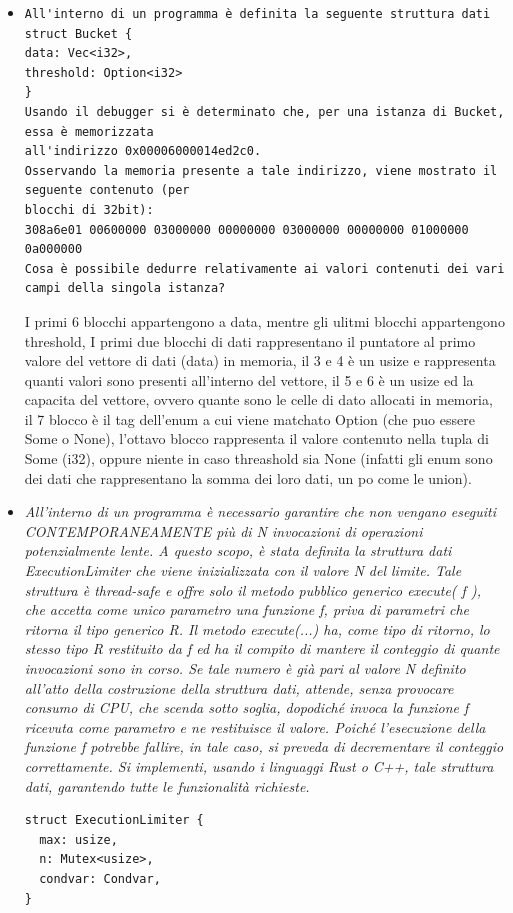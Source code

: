 \documentclass[12pt]{article}
\begin{document}
\begin{itemize}
  \item
  \begin{lstlisting}[langua=rust]
All'interno di un programma è definita la seguente struttura dati
struct Bucket {
data: Vec<i32>,
threshold: Option<i32>
}
Usando il debugger si è determinato che, per una istanza di Bucket, essa è memorizzata
all'indirizzo 0x00006000014ed2c0.
Osservando la memoria presente a tale indirizzo, viene mostrato il seguente contenuto (per
blocchi di 32bit):
308a6e01 00600000 03000000 00000000 03000000 00000000 01000000 0a000000
Cosa è possibile dedurre relativamente ai valori contenuti dei vari campi della singola istanza?
  \end{lstlisting}
  I primi 6 blocchi appartengono a data, mentre gli ulitmi blocchi appartengono threshold,
  I primi due blocchi di dati rappresentano il puntatore al primo valore del vettore di dati (data) in memoria, il 3 e 4 \`e un usize e rappresenta quanti valori sono presenti all'interno del vettore, il 5 e 6 \`e un usize ed la capacita del vettore, ovvero quante sono le celle di dato allocati in memoria, il 7 blocco \`e il tag dell'enum a cui viene matchato Option (che puo essere Some o None), l'ottavo blocco rappresenta il valore contenuto nella tupla di Some (i32), oppure niente in caso threashold sia None (infatti gli enum sono dei dati che rappresentano la somma dei loro dati, un po come le union).
  \item \emph{All'interno di un programma è necessario garantire che non vengano eseguiti
CONTEMPORANEAMENTE più di N invocazioni di operazioni potenzialmente lente.
A questo scopo, è stata definita la struttura dati ExecutionLimiter che viene inizializzata con il
valore N del limite. Tale struttura è thread-safe e offre solo il metodo pubblico generico execute( f
), che accetta come unico parametro una funzione f, priva di parametri che ritorna il tipo generico
R. Il metodo execute(...) ha, come tipo di ritorno, lo stesso tipo R restituito da f ed ha il compito di
mantere il conteggio di quante invocazioni sono in corso. Se tale numero è già pari al valore N
definito all'atto della costruzione della struttura dati, attende, senza provocare consumo di CPU,
che scenda sotto soglia, dopodiché invoca la funzione f ricevuta come parametro e ne restituisce il
valore. Poiché l'esecuzione della funzione f potrebbe fallire, in tale caso, si preveda di
decrementare il conteggio correttamente.
Si implementi, usando i linguaggi Rust o C++, tale struttura dati, garantendo tutte le funzionalità
richieste.}
  \begin{lstlisting}[langua=rust]
struct ExecutionLimiter {
  max: usize,
  n: Mutex<usize>,
  condvar: Condvar,
}


\end{lstlisting}
\end{itemize}
\end{document}
